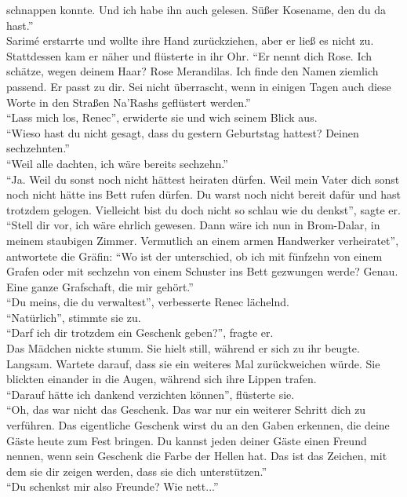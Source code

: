 schnappen konnte. Und ich habe ihn auch gelesen. Süßer Kosename, den du da hast.''\\
Sarimé erstarrte und wollte ihre Hand zurückziehen, aber er ließ es nicht zu. Stattdessen kam er 
näher und flüsterte in ihr Ohr. ``Er nennt dich Rose. Ich schätze, wegen deinem Haar? Rose 
Merandilas. Ich finde den Namen ziemlich passend. Er passt zu dir. Sei nicht überrascht, wenn in 
einigen Tagen auch diese Worte in den Straßen Na'Rashs geflüstert werden.''\\
``Lass mich los, Renec'', erwiderte sie und wich seinem Blick aus.\\
``Wieso hast du nicht gesagt, dass du gestern Geburtstag hattest? Deinen sechzehnten.''\\
``Weil alle dachten, ich wäre bereits sechzehn.''\\
``Ja. Weil du sonst noch nicht hättest heiraten dürfen. Weil mein Vater dich sonst noch nicht hätte 
ins Bett rufen dürfen. Du warst noch nicht bereit dafür und hast trotzdem gelogen. Vielleicht bist 
du doch nicht so schlau wie du denkst'', sagte er.\\
``Stell dir vor, ich wäre ehrlich gewesen. Dann wäre ich nun in Brom-Dalar, in meinem staubigen 
Zimmer. Vermutlich an einem armen Handwerker verheiratet'', antwortete die Gräfin: ``Wo ist der 
unterschied, ob ich mit fünfzehn von einem Grafen oder mit sechzehn von einem Schuster ins Bett 
gezwungen werde? Genau. Eine ganze Grafschaft, die mir gehört.''\\
``Du meins, die du verwaltest'', verbesserte Renec lächelnd.\\
``Natürlich'', stimmte sie zu.\\
``Darf ich dir trotzdem ein Geschenk geben?'', fragte er.\\
Das Mädchen nickte stumm. Sie hielt still, während er sich zu ihr beugte. Langsam. Wartete darauf, 
dass sie ein weiteres Mal zurückweichen würde. Sie blickten einander in die Augen, während sich 
ihre Lippen trafen.\\
``Darauf hätte ich dankend verzichten können'', flüsterte sie.\\
``Oh, das war nicht das Geschenk. Das war nur ein weiterer Schritt dich zu verführen. Das 
eigentliche Geschenk wirst du an den Gaben erkennen, die deine Gäste heute zum Fest bringen. Du 
kannst jeden deiner Gäste einen Freund nennen, wenn sein Geschenk die Farbe der Hellen hat. Das ist 
das Zeichen, mit dem sie dir zeigen werden, dass sie dich unterstützen.''\\
``Du schenkst mir also Freunde? Wie nett...''\\
